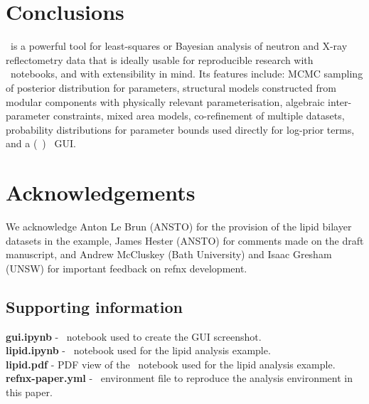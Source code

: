 \documentclass[12pt]{article}
\begin{document}
\section*{Conclusions}\label{conclusions}
\ is a powerful tool for least-squares or Bayesian analysis of neutron and X-ray reflectometry data that is ideally usable for reproducible research with \Jupyter\ notebooks, and with extensibility in mind. Its features include: MCMC sampling of posterior distribution for parameters, structural models constructed from modular components with physically relevant parameterisation, algebraic inter-parameter constraints, mixed area models, co-refinement of multiple datasets, probability distributions for parameter bounds used directly for log-prior terms, and a (\Jupyter\ ) \ipywidgets\ GUI.

\section*{Acknowledgements}
We acknowledge Anton Le Brun (ANSTO) for the provision of the lipid bilayer datasets in the example, James Hester (ANSTO) for comments made on the draft manuscript, and Andrew McCluskey (Bath University) and Isaac Gresham (UNSW) for important feedback on refnx development.

\subsection*{Supporting information}
\textbf{gui.ipynb} - \Jupyter\ notebook used to create the GUI screenshot.\\
\textbf{lipid.ipynb} - \Jupyter\ notebook used for the lipid analysis example.\\
\textbf{lipid.pdf} - PDF view of the \Jupyter\ notebook used for the lipid analysis example.\\
\textbf{refnx-paper.yml} - \conda\ environment file to reproduce the analysis environment in this paper.

{}

\end{document}

